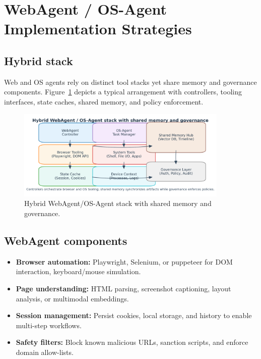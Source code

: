 \documentclass{article}
\begin{document}
\section{WebAgent / OS-Agent Implementation Strategies}
\subsection{Hybrid stack}
Web and OS agents rely on distinct tool stacks yet share memory and governance components. Figure~\ref{fig:hybrid_agent_stack_en} depicts a typical arrangement with controllers, tooling interfaces, state caches, shared memory, and policy enforcement.
\begin{figure}[H]
  \centering
  \includegraphics[width=0.9\textwidth]{hybrid_agent_stack.png}
  \caption{Hybrid WebAgent/OS-Agent stack with shared memory and governance.}
  \label{fig:hybrid_agent_stack_en}
\end{figure}

\subsection{WebAgent components}
\begin{itemize}
  \item \textbf{Browser automation:} Playwright, Selenium, or puppeteer for DOM interaction, keyboard/mouse simulation.
  \item \textbf{Page understanding:} HTML parsing, screenshot captioning, layout analysis, or multimodal embeddings.
  \item \textbf{Session management:} Persist cookies, local storage, and history to enable multi-step workflows.
  \item \textbf{Safety filters:} Block known malicious URLs, sanction scripts, and enforce domain allow-lists.
\end{itemize}
\end{document}
